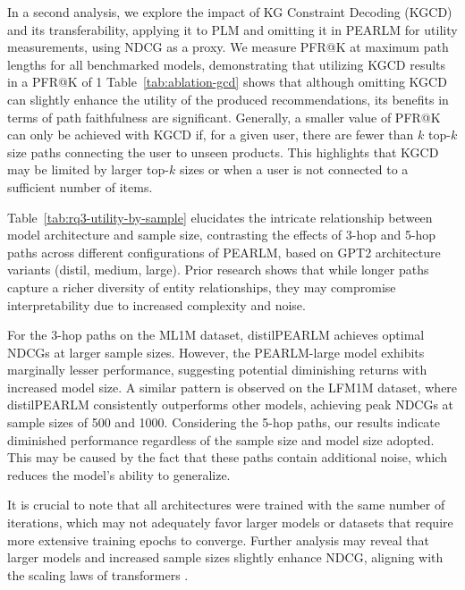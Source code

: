 \documentclass[sigconf]{acmart}
\begin{document}
In a second analysis, we explore the impact of KG Constraint Decoding (KGCD) and its transferability, applying it to PLM and omitting it in PEARLM for utility measurements, using NDCG as a proxy. We measure PFR@K at maximum path lengths for all benchmarked models, demonstrating that utilizing KGCD results in a PFR@K of 1 Table~\ref{tab:ablation-gcd} shows that although omitting KGCD can slightly enhance the utility of the produced recommendations, its benefits in terms of path faithfulness are significant. Generally, a smaller value of PFR@K can only be achieved with KGCD if, for a given user, there are fewer than \(k\) top-\(k\) size paths connecting the user to unseen products. This highlights that KGCD may be limited by larger top-\(k\) sizes or when a user is not connected to a sufficient number of items.



Table~\ref{tab:rq3-utility-by-sample} elucidates the intricate relationship between model architecture and sample size, contrasting the effects of 3-hop and 5-hop paths across different configurations of PEARLM, based on GPT2 architecture variants (distil, medium, large). Prior research \cite{wang2018explainable} shows that while longer paths capture a richer diversity of entity relationships, they may compromise interpretability due to increased complexity and noise.

For the 3-hop paths on the ML1M dataset, distilPEARLM achieves optimal NDCGs at larger sample sizes. However, the PEARLM-large model exhibits marginally lesser performance, suggesting potential diminishing returns with increased model size. A similar pattern is observed on the LFM1M dataset, where distilPEARLM consistently outperforms other models, achieving peak NDCGs at sample sizes of 500 and 1000. Considering the 5-hop paths, our results indicate diminished performance regardless of the sample size and model size adopted. This may be caused by the fact that these paths contain additional noise, which reduces the model's ability to generalize.

It is crucial to note that all architectures were trained with the same number of iterations, which may not adequately favor larger models or datasets that require more extensive training epochs to converge. Further analysis may reveal that larger models and increased sample sizes slightly enhance NDCG, aligning with the scaling laws of transformers \cite{kaplan2020scaling}.
\end{document}
